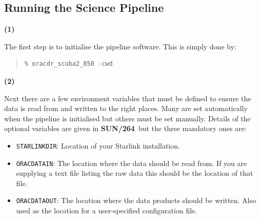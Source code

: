 \documentclass[twoside,11pt]{article}
\newcommand{\xref}[3]{#1}
\newcommand{\xlabel}[1]{}
\renewcommand{\_}{\texttt{\symbol{95}}}
\newenvironment{myquote}{\begin{quote}\begin{small}}{\end{small}\end{quote}}
\newcommand{\param}[1]{\texttt{#1}}
\newcommand{\pipelinesun}{\xref{\textbf{SUN/264}}{sun264}{}}
\begin{document}
\subsection{\xlabel{running_pl}Running the Science Pipeline}
\label{sec:runpl}
\begin{minipage}[t]{0.05\linewidth}
\textbf{(1)}
\end{minipage}
\begin{minipage}[t]{0.95\linewidth}
The first step is to initialise the pipeline software. This is simply done by:
\begin{myquote}
\begin{verbatim}
% oracdr_scuba2_850 -cwd

\end{verbatim}
\end{myquote}
\end{minipage}

\begin{minipage}[t]{0.05\linewidth}
\textbf{(2)}
\end{minipage}
\begin{minipage}[t]{0.95\linewidth}
Next there are a few environment variables that must be defined to
ensure the data is read from and written to the right places. Many are
set automatically when the pipeline is initialised but others must be
set manually. Details of the optional variables are given in
\pipelinesun\ but the three mandatory ones are:
\begin{itemize}\itemsep-0.1em
\item \param{STARLINK\_DIR}: Location of your Starlink installation.
\item \param{ORAC\_DATA\_IN}: The location where the data should be read from.
If you are supplying a text file listing the raw data this should be the
location of that file.
\item \param{ORAC\_DATA\_OUT}: The location where the data products should be
written. Also used as the location for a user-specified configuration file.\\
\end{itemize}
\end{minipage}
\end{document}
